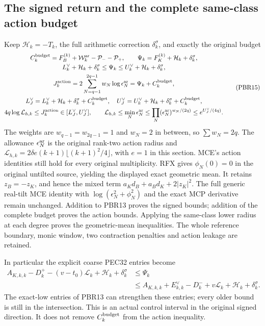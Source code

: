\documentclass[11pt,a4paper]{article}
\begin{document}
\subsection{The signed return and the complete same-class action budget}

Keep $\mathcal H_k=-T_k$, the full arithmetic correction
$\delta_k^\sigma$, and exactly the original budget
\[
\begin{gathered}
 C_k^{\rm budget}
 =F_B^{(k)}+\mathcal W_k^{\rm ar}-\mathcal P_--\mathcal P_+,\qquad
 \Psi_k=F_K^{(k)}+\mathcal H_k+\delta_k^\sigma,\\
 L_k^\vee+\mathcal H_k+\delta_k^\sigma
 \le\Psi_k\le U_k^\vee+\mathcal H_k+\delta_k^\sigma,\\
 J_k^{\rm action}
 =2\sum_{N=q-1}^{2q-1}w_N\log\epsilon_N^{\rm ar}
 =\Psi_k+C_k^{\rm budget},\\
 L_J^\vee=L_k^\vee+\mathcal H_k+\delta_k^\sigma+C_k^{\rm budget},
 \quad
 U_J^\vee=U_k^\vee+\mathcal H_k+\delta_k^\sigma+C_k^{\rm budget},\\
 4q\log\mathcal L_{h,k}\le J_k^{\rm action}
       \in[L_J^\vee,U_J^\vee],\qquad
 \mathcal L_{h,k}\le\min_N\epsilon_N^{\rm ar}
 \le\prod_N(\epsilon_N^{\rm ar})^{w_N/(2q)}
 \le e^{U_J^\vee/(4q)} .
\end{gathered}\tag{PBR15}
\]
The weights are $w_{q-1}=w_{2q-1}=1$ and $w_N=2$ in between,
so $\sum w_N=2q$. The allowance $\epsilon_N^{\rm ar}$ is the
original rank-two action radius and
$\mathcal L_{h,k}=2\delta e(k+1)\lfloor(k+1)^2/4\rfloor$,
with $e=1$ in this section. MCE's action identities still hold
for every original multiplicity. RFX gives $\phi_N(0)=0$ in
the original untilted source, yielding the displayed exact
geometric mean. It retains $z_B=-z_K$, and hence the mixed
term $a_Kd_B+a_Bd_K+2|z_K|^2$. The full generic real-tilt MCE
identity with $\log(\epsilon_N^2+\phi_N^2)$ and the exact MCP
derivative remain unchanged. Addition to PBR13 proves the
signed bounds; addition of the complete budget proves the
action bounds. Applying the same-class lower radius at each
degree proves the geometric-mean inequalities. The whole
reference boundary, monic window, two contraction penalties
and action leakage are retained.

In particular the explicit coarse PEC32 entries become
\[
\begin{split}
 A_{K,k,k}-D_k^+-(v-t_0)\mathcal L_k
          +\mathcal H_k+\delta_k^\sigma
 &\le\Psi_k\\
 &\le A_{K,k,k}+E_{k,k}^{\vee}-D_k^-+v\mathcal L_k
          +\mathcal H_k+\delta_k^\sigma .
\end{split}\tag{PBR16}
\]
The exact-low entries of PBR13 can strengthen these entries;
every older bound is still in the intersection. This is an
actual control interval in the original signed direction. It
does not remove $C_k^{\rm budget}$ from the action inequality.
\end{document}
